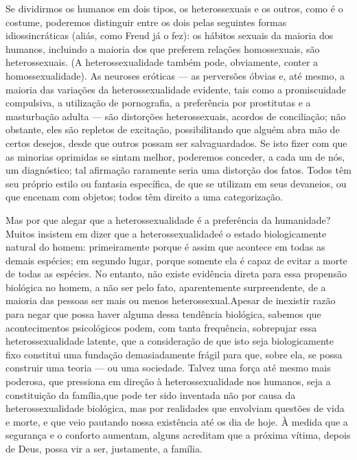 Se dividirmos os humanos em dois tipos, os heterossexuais e os
outros, como é o costume, poderemos distinguir entre os dois pelas
seguintes formas idiossincráticas (aliás, como Freud\idxfreud{} já o fez): os
hábitos sexuais da maioria dos humanos, incluindo a maioria dos que
preferem relações homossexuais, são heterossexuais. (A
heterossexualidade também pode, obviamente, conter a homossexualidade).
As neuroses eróticas --- as perversões óbvias e, até mesmo, a maioria
das variações da heterossexualidade evidente, tais como a promiscuidade\idxpromiscomp{}
compulsiva, a utilização de pornografia,\idxporno{} a preferência por\idxprost{} prostitutas\idxprost{}
e a masturbação\idxmastur{} adulta --- são distorções heterossexuais, acordos de
conciliação; não obstante, eles são repletos de excitação,
possibilitando que alguém abra mão de certos desejos, desde que outros
possam ser salvaguardados. Se isto fizer com que as minorias oprimidas
se sintam melhor, poderemos conceder, a cada um de nós, um diagnóstico;
tal afirmação raramente seria uma distorção dos fatos. Todos têm seu
próprio estilo ou fantasia específica, de que se utilizam em seus
devaneios, ou que encenam com objetos; todos têm direito a uma
categorização.

Mas por que alegar que a heterossexualidade é a preferência da
humanidade? Muitos insistem em dizer que a heterossexualidade\idxheterocrit[|(] é o
estado biologicamente natural do homem: primeiramente porque é assim
que acontece em todas as demais espécies; em segundo lugar, porque
somente ela é capaz de evitar a morte de todas as espécies. No entanto,
não existe evidência direta para essa propensão biológica no homem, a
não ser pelo fato, aparentemente surpreendente, de a maioria das
pessoas ser mais ou menos heterossexual.\idxheterohomo[|)] Apesar de inexistir razão para
negar que possa haver alguma dessa tendência biológica, sabemos que
acontecimentos psicológicos podem, com tanta frequência, sobrepujar
essa heterossexualidade latente, que a consideração de que isto seja
biologicamente fixo constitui uma fundação demasiadamente frágil para
que, sobre ela, se possa construir uma teoria --- ou uma sociedade.
Talvez uma força até mesmo mais poderosa, que pressiona em direção à
heterossexualidade nos humanos, seja a constituição da família,\idxheteroinfl[|(] que
pode ter sido inventada não por causa da heterossexualidade biológica,
mas por realidades que envolviam questões de vida e morte, e que veio
pautando nossa existência até os dia de hoje. À medida que a segurança
e o conforto aumentam, alguns acreditam que a próxima vítima, depois de
Deus, possa vir a ser, justamente, a família.

